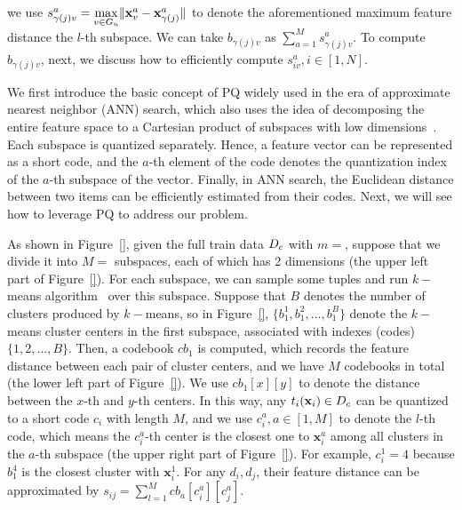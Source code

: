 \noindent we use $s^a_{\gamma(j)v} = \max\limits_{v \in G_u}\lVert \mathbf{x}^a_v - \mathbf{x}^a_{\gamma(j)}\rVert$ to denote the aforementioned maximum feature distance \wrt the $l$-th subspace. We can take $b_{\gamma(j)v}$ as $\sum_{a=1}^{M} s^a_{\gamma(j)v}$. To compute $b_{\gamma(j)v}$, next, we  discuss how to efficiently compute  $s^a_{iv}, i\in [1,N]$.

We first  introduce the basic concept of PQ widely used in the era of approximate nearest neighbor (ANN) search, which also uses the idea of  decomposing the entire feature space to a Cartesian product of subspaces with low dimensions~\cite{}. Each subspace is quantized separately. Hence, a feature vector can be represented as a short code, and the $a$-th element of the code denotes the  quantization index of the $a$-th subspace of the vector. Finally, in ANN search,  the Euclidean distance between two items can be efficiently estimated from their codes. Next, we will see how to leverage PQ to address our problem.

As shown  in Figure~\ref{}, given the full train data $D_c$ with $m=$, suppose that we divide it into $M=$ subspaces, each of which has 2 dimensions (the upper left part of Figure~\ref{}).  For each subspace, we can sample some tuples and run $k-$means algorithm~\cite{} over this subspace. Suppose that $B$ denotes the number of clusters produced by $k-$means, so in Figure~\ref{}, $\{b_1^1, b_1^2,..., b_1^B\}$ denote the $k-$means cluster centers in the first subspace, associated with indexes (codes) $\{1, 2,...,B\}$. Then, a codebook $cb_1$ is computed, which records the feature distance between each pair of cluster centers, and we have $M$ codebooks in total (the lower left part of Figure~\ref{}). We use $cb_1[x][y]$ to denote the distance between the $x$-th and $y$-th centers. In this way, any $t_i (\mathbf{x}_i) \in D_c$ can be quantized to a short code $c_i$ with length $M$, and we use $c_i^a, a\in[1,M]$  to denote the $l$-th code, which means the $c_i^a$-th center is the closest one to $\mathbf{x}_i^a$ among all clusters in the $a$-th subspace (the upper right part of Figure~\ref{}). For example, $c_i^1 =4$ because $b_1^4$ is the closest cluster with $\mathbf{x}_i^1$. For any $d_i, d_j$, their feature distance can be approximated by $s_{ij}=\sum_{l=1}^{M}cb_a[c_i^a][c_j^a]$. 



